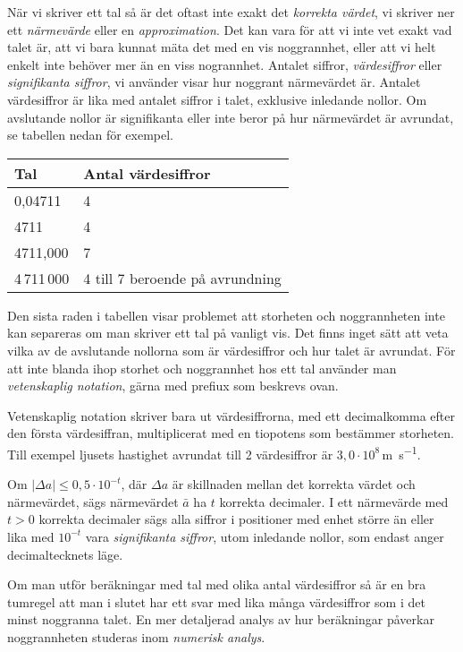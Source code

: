 När vi skriver ett tal så är det oftast inte exakt det \emph{korrekta
värdet}, vi skriver ner ett \emph{närmevärde} eller en
\emph{approximation}.  Det kan vara för att vi inte vet exakt vad
talet är, att vi bara kunnat mäta det med en vis noggrannhet, eller
att vi helt enkelt inte behöver mer än en viss nogrannhet. Antalet
siffror, \emph{värdesiffror} eller \emph{signifikanta siffror}, vi
använder visar hur noggrant närmevärdet är.  Antalet värdesiffror är
lika med antalet siffror i talet, exklusive inledande nollor.  Om
avslutande nollor är signifikanta eller inte beror på hur närmevärdet
är avrundat, se tabellen nedan för exempel.

\bigskip
\begin{centering}
\begin{tabular}{|l|l|}
\hline
Tal & Antal värdesiffror \\
\hline
0,04711 & 4\\
4711 & 4 \\
4711,000 & 7 \\
4\,711\,000 & 4 till 7 beroende på avrundning \\
\hline
\end{tabular}
\end{centering}
\bigskip

Den sista raden i tabellen visar problemet att storheten och
noggrannheten inte kan separeras om man skriver ett tal på vanligt
vis. Det finns inget sätt att veta vilka av de avslutande nollorna som
är värdesiffror och hur talet är avrundat.  För att inte blanda ihop
storhet och noggrannhet hos ett tal använder man \emph{vetenskaplig
notation}, gärna med prefiux som beskrevs ovan.

Vetenskaplig notation skriver bara ut värdesiffrorna, med ett
decimalkomma efter den första värdesiffran, multiplicerat med en
tiopotens som bestämmer storheten. Till exempel ljusets hastighet
avrundat till 2 värdesiffror är $3,0 \cdot 10^8$\,\si{\metre\per\second}.

Om $|\Delta a|\leq 0,5\cdot 10^{-t}$, där $\Delta a$ är skillnaden
mellan det korrekta värdet och närmevärdet, sägs närmevärdet $\bar
{a}$ ha $t$ korrekta decimaler.
I ett närmevärde med $t>0$ korrekta decimaler sägs alla siffror i
positioner med enhet större än eller lika med $10^{-t}$ vara
\emph{signifikanta siffror}, utom inledande nollor, som endast anger
decimaltecknets läge.

Om man utför beräkningar med tal med olika antal värdesiffror så är en
bra tumregel att man i slutet har ett svar med lika många värdesiffror
som i det minst noggranna talet. En mer detaljerad analys av hur
beräkningar påverkar noggrannheten studeras inom \emph{numerisk
analys}.

